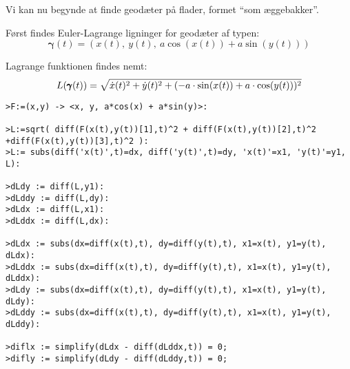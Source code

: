 Vi kan nu begynde at finde geodæter på flader, formet ``som æggebakker''.

Først findes Euler-Lagrange ligninger for geodæter af typen:
\begin{equation}\label{eq:aeggegeo}
\pmb{\gamma}(t) = (x(t),~y(t),~a\cos(x(t)) + a\sin(y(t)))
\end{equation}

Lagrange funktionen findes nemt:
\begin{equation*}
L(\pmb{\gamma}(t)) = \sqrt{\dot{x}(t)^2 + \dot{y}(t)^2 + ( -a \cdot \sin(x(t)) + a \cdot \cos(y(t)) )^2}
\end{equation*}
 
\begin{lstlisting}[caption=Udregning af de to Lagrange ligninger til (\ref{eq:aeggegeo}) med \emph{Maple}  ]
>F:=(x,y) -> <x, y, a*cos(x) + a*sin(y)>:

>L:=sqrt( diff(F(x(t),y(t))[1],t)^2 + diff(F(x(t),y(t))[2],t)^2 +diff(F(x(t),y(t))[3],t)^2 ):
>L:= subs(diff('x(t)',t)=dx, diff('y(t)',t)=dy, 'x(t)'=x1, 'y(t)'=y1, L):

>dLdy := diff(L,y1):
>dLddy := diff(L,dy):
>dLdx := diff(L,x1):
>dLddx := diff(L,dx):

>dLdx := subs(dx=diff(x(t),t), dy=diff(y(t),t), x1=x(t), y1=y(t), dLdx):
>dLddx := subs(dx=diff(x(t),t), dy=diff(y(t),t), x1=x(t), y1=y(t), dLddx):
>dLdy := subs(dx=diff(x(t),t), dy=diff(y(t),t), x1=x(t), y1=y(t), dLdy):
>dLddy := subs(dx=diff(x(t),t), dy=diff(y(t),t), x1=x(t), y1=y(t), dLddy):

>diflx := simplify(dLdx - diff(dLddx,t)) = 0;
>difly := simplify(dLdy - diff(dLddy,t)) = 0;
\end{lstlisting}

